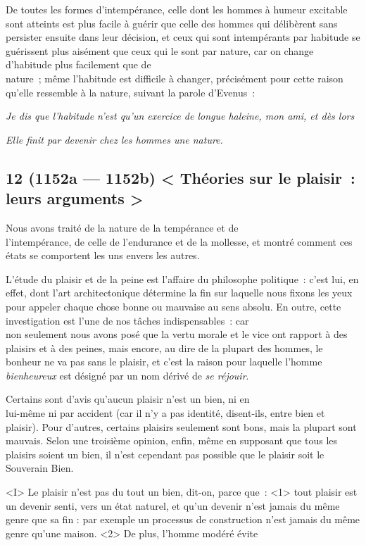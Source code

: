 \documentclass[french,twoside]{book} %
\begin{document}
De toutes les formes d’intempérance, celle dont les hommes à humeur excitable sont atteints est plus facile à guérir que celle des hommes qui délibèrent sans persister ensuite dans leur décision, et ceux qui sont intempérants par habitude se guérissent plus aisément que ceux qui le sont par nature, car on change d’habitude plus facilement que de \\
nature ; même l’habitude est difficile à changer, précisément pour cette raison qu’elle ressemble à la nature, suivant la parole d’Evenus :\par
 {\itshape Je dis que l’habitude n’est qu’un exercice de longue haleine, mon ami, et dès lors} \par
 {\itshape Elle finit par devenir chez les hommes une nature.} 
\subsection[{12 (1152a — 1152b) < Théories sur le plaisir : leurs arguments >}]{12 (1152a — 1152b) < Théories sur le plaisir : leurs arguments >}
\noindent Nous avons traité de la nature de la tempérance et de \\
l’intempérance, de celle de l’endurance et de la mollesse, et montré comment ces états se comportent les uns envers les autres.\par
 L’étude du plaisir et de la peine est l’affaire du philosophe politique : c’est lui, en effet, dont l’art architectonique détermine la fin sur laquelle nous fixons les yeux pour appeler chaque chose bonne ou mauvaise au sens absolu. En outre, cette investigation est l’une de nos tâches indispensables : car \\
non seulement nous avons posé que la vertu morale et le vice ont rapport à des plaisirs et à des peines, mais encore, au dire de la plupart des hommes, le bonheur ne va pas sans le plaisir, et c’est la raison pour laquelle l’homme {\itshape bienheureux} est désigné par un nom dérivé de {\itshape se réjouir}.\par
Certains sont d’avis qu’aucun plaisir n’est un bien, ni en \\
lui-même ni par accident (car il n’y a pas identité, disent-ils, entre bien et plaisir). Pour d’autres, certains plaisirs seulement sont bons, mais la plupart sont mauvais. Selon une troisième opinion, enfin, même en supposant que tous les plaisirs soient un bien, il n’est cependant pas possible que le plaisir soit le Souverain Bien.\par
<I> Le plaisir n’est pas du tout un bien, dit-on, parce que : <1> tout plaisir est un devenir senti, vers un état naturel, et qu’un devenir n’est jamais du même genre que sa fin : par exemple un processus de construction n’est jamais du même genre qu’une maison. <2> De plus, l’homme modéré évite \\
\end{document}
